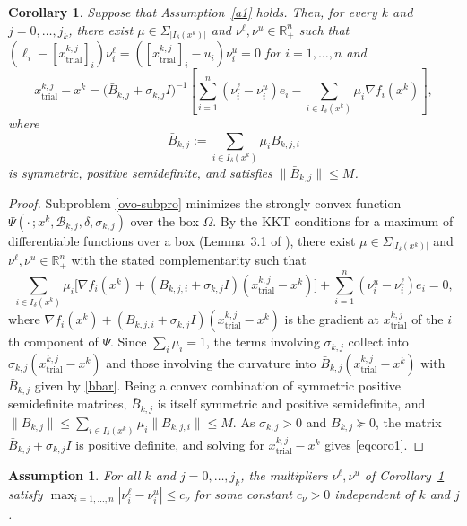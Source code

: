 \documentclass[11pt]{article}
\newcommand{\xkjtrial}{x^{k,j}_{\mathrm{trial}}}
\newtheorem{corollary}[theorem]{Corollary}
\newtheorem{assumption}{Assumption}
\begin{document}
\begin{corollary} \label{cor:step}
Suppose that Assumption~\ref{a1} holds. Then, for every $k$ and
$j = 0, \ldots, j_k$, there exist $\mu \in \Sigma_{|I_\delta(x^k)|}$ and
$\nu^\ell, \nu^u \in \mathbb{R}^n_+$ such that
$(\ell_i - [\xkjtrial]_i)\nu^\ell_i = ([\xkjtrial]_i - u_i)\nu^u_i = 0$ for
$i = 1, \ldots, n$ and
\begin{equation} \label{eqcoro1}
\xkjtrial - x^k = \big( \bar{B}_{k,j} + \sigma_{k,j} I \big)^{-1}
\left[ \sum_{i=1}^{n} (\nu^\ell_i - \nu^u_i) e_i
- \sum_{i \in I_\delta(x^k)} \mu_i \nabla f_i(x^k) \right],
\end{equation}
where
\begin{equation} \label{bbar}
\bar{B}_{k,j} := \sum_{i \in I_\delta(x^k)} \mu_i B_{k,j,i}
\end{equation}
is symmetric, positive semidefinite, and satisfies
$\|\bar{B}_{k,j}\| \leq M$.
\end{corollary}

\begin{proof}
Subproblem \eqref{ovo-subpro} minimizes the strongly convex function
$\Psi(\cdot\,; x^k, \mathcal{B}_{k,j}, \delta, \sigma_{k,j})$ over the box
$\Omega$. By
the KKT conditions for a maximum of differentiable functions over a box
(Lemma~3.1 of \cite{alvarezovo}), there exist $\mu \in \Sigma_{|I_\delta(x^k)|}$ and
$\nu^\ell, \nu^u \in \mathbb{R}^n_+$ with the stated complementarity such that
\[
\sum_{i \in I_\delta(x^k)} \mu_i
\big[ \nabla f_i(x^k) + (B_{k,j,i} + \sigma_{k,j} I)(\xkjtrial - x^k) \big]
+ \sum_{i=1}^n (\nu^u_i - \nu^\ell_i) e_i = 0,
\]
where $\nabla f_i(x^k) + (B_{k,j,i} + \sigma_{k,j} I)(\xkjtrial - x^k)$ is the
gradient at $\xkjtrial$ of the $i$th component of $\Psi$. Since
$\sum_i \mu_i = 1$, the terms involving $\sigma_{k,j}$ collect into
$\sigma_{k,j}(\xkjtrial - x^k)$ and those involving the curvature into
$\bar{B}_{k,j}(\xkjtrial - x^k)$ with $\bar{B}_{k,j}$ given by \eqref{bbar}.
Being a convex combination of symmetric positive semidefinite matrices,
$\bar{B}_{k,j}$ is itself symmetric and positive semidefinite, and
$\|\bar{B}_{k,j}\| \leq \sum_{i \in I_\delta(x^k)} \mu_i \|B_{k,j,i}\| \leq M$.
As $\sigma_{k,j} > 0$ and $\bar{B}_{k,j} \succeq 0$, the matrix
$\bar{B}_{k,j} + \sigma_{k,j} I$ is positive definite, and solving for
$\xkjtrial - x^k$ gives \eqref{eqcoro1}.
\end{proof}

\begin{assumption} \label{a2}
For all $k$ and $j = 0, \ldots, j_k$, the multipliers $\nu^\ell, \nu^u$ of
Corollary~\ref{cor:step} satisfy
$\max_{i = 1, \ldots, n} |\nu^\ell_i - \nu^u_i| \leq c_\nu$ for some constant
$c_\nu > 0$ independent of $k$ and $j$.
\end{assumption}
\end{document}
